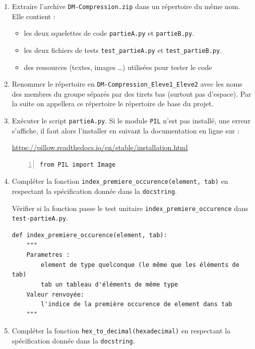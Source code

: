 \documentclass[a4paper, french, 12pt]{article}  %
\newcounter{def}
\begin{document}
\begin{enumerate}
\item Extraire l'archive \texttt{DM-Compression.zip} dans un répertoire du même nom. Elle contient :

\begin{itemize}
\item les deux squelettes de code \texttt{partieA.py} et \texttt{partieB.py}.
\item  les deux fichiers de tests \texttt{test\_partieA.py} et \texttt{test\_partieB.py}.
\item des ressources (textes, images \ldots ) utilisées pour tester le code
\end{itemize}

\item Renommer le répertoire en  \texttt{DM-Compression\_Eleve1\_Eleve2}  avec les noms des membres du groupe séparés par des tirets bas (surtout pas d'espace). Par la suite on appellera ce répertoire le répertoire de base du projet.
	\item Exécuter le script \texttt{partieA.py}. Si le module \texttt{PIL} n'est pas installé, une erreur s'affiche, il faut alors l'installer en suivant la documentation en ligne sur :
	\begin{center}
	 \url{https://pillow.readthedocs.io/en/stable/installation.html}	
	\end{center}

	
\begin{lstlisting}[style=rond, numbers=left]
from PIL import Image
\end{lstlisting}

\item Compléter la fonction \verb+index_premiere_occurence(element, tab)+ en respectant la spécification donnée dans la \texttt{docstring}. 

Vérifier si la fonction passe le test unitaire \verb+index_premiere_occurence+ dans \texttt{test-partieA.py}.

\begin{lstlisting}[style=rond]
def index_premiere_occurence(element, tab):
    """
    Parametres :
        element de type quelconque (le même que les éléments de tab)
        tab un tableau d'éléments de même type
    Valeur renvoyée:
        l'indice de la première occurence de element dans tab
    """
\end{lstlisting}

\item Compléter la fonction \verb+hex_to_decimal(hexadecimal)+ en respectant la spécification donnée dans la \texttt{docstring}. 


\end{enumerate}
\end{document}
